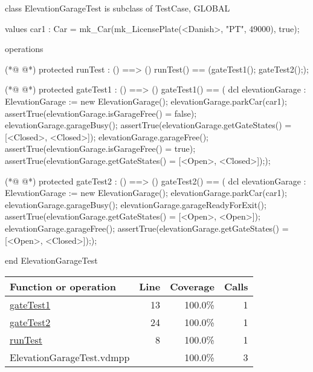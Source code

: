 \begin{vdmpp}[breaklines=true]
class ElevationGarageTest is subclass of TestCase, GLOBAL

values
car1 : Car = mk_Car(mk_LicensePlate(<Danish>, "PT", 49000), true); 

operations 

(*@
\label{runTest:8}
@*)
protected runTest : () ==> ()
runTest() == 
 (gateTest1();
  gateTest2(););

(*@
\label{gateTest1:13}
@*)
protected gateTest1 : () ==> ()
gateTest1() == (
 dcl elevationGarage : ElevationGarage := new ElevationGarage();
 elevationGarage.parkCar(car1);
 assertTrue(elevationGarage.isGarageFree() = false);
 elevationGarage.garageBusy();
 assertTrue(elevationGarage.getGateStates() = [<Closed>, <Closed>]);
 elevationGarage.garageFree();
 assertTrue(elevationGarage.isGarageFree() = true);
 assertTrue(elevationGarage.getGateStates() = [<Open>, <Closed>]););

(*@
\label{gateTest2:24}
@*)
protected gateTest2 : () ==> ()
gateTest2() == (
 dcl elevationGarage : ElevationGarage := new ElevationGarage();
 elevationGarage.parkCar(car1);
 elevationGarage.garageBusy();
 elevationGarage.garageReadyForExit();
 assertTrue(elevationGarage.getGateStates() = [<Open>, <Open>]);
 elevationGarage.garageFree();
 assertTrue(elevationGarage.getGateStates() = [<Open>, <Closed>]););
 
end ElevationGarageTest
\end{vdmpp}
\bigskip
\begin{longtable}{|l|r|r|r|}
\hline
Function or operation & Line & Coverage & Calls \\
\hline
\hline
\hyperref[gateTest1:13]{gateTest1} & 13&100.0\% & 1 \\
\hline
\hyperref[gateTest2:24]{gateTest2} & 24&100.0\% & 1 \\
\hline
\hyperref[runTest:8]{runTest} & 8&100.0\% & 1 \\
\hline
\hline
ElevationGarageTest.vdmpp & & 100.0\% & 3 \\
\hline
\end{longtable}

